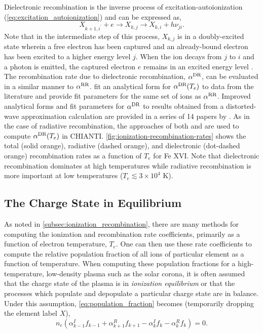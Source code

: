 Dielectronic recombination is the inverse process of excitation-autoionization (\autoref{eq:excitation_autoionization}) and can be expressed as,
\begin{equation}\label{eq:dielectronic_recombination}
    X_{k+1,i^\prime} + e \to X_{k,j} \to X_{k,i} + h\nu_{ji}.
\end{equation}
Note that in the intermediate step of this process, $X_{k,j}$ is in a doubly-excited state wherein a free electron has been captured and an already-bound electron has been excited to a higher energy level $j$. When the ion decays from $j$ to $i$ and a photon is emitted, the captured electron $e$ remains in an excited energy level \citep{bradshaw_collisional_2013}. The recombination rate due to dielectronic recombination, $\alpha^\textup{DR}$, can be evaluated in a similar manner to $\alpha^\textup{RR}$. \citet{shull_ionization_1982} fit an analytical form for $\alpha^\textup{DR}(T_e)$ to data from the literature and provide fit parameters for the same set of ions as $\alpha^\textup{RR}$. Improved analytical forms and fit parameters for $\alpha^\textup{DR}$ to results obtained from a distorted-wave approximation calculation are provided in a series of 14 papers by \citet{badnell_dielectronic_2003}. As in the case of radiative recombination, the approaches of both \citet{shull_ionization_1982} and \citet{badnell_dielectronic_2003} are used to compute $\alpha^\textup{DR}(T_e)$ in CHIANTI. \autoref{fig:ionization-recombination-rates} shows the total (solid orange), radiative (dashed orange), and dielectronic (dot-dashed orange) recombination rates as a function of $T_e$ for Fe XVI. Note that dielectronic recombination dominates at high temperatures while radiative recombination is more important at low temperatures ($T_e\lesssim3\times10^4$ K).

\subsection{The Charge State in Equilibrium}\label{sec:ioneq}

As noted in \autoref{subsec:ionization_recombination}, there are many methods for computing the ionization and recombination rate coefficients, primarily as a function of electron temperature, $T_e$. One can then use these rate coefficients to compute the relative population fraction of all ions of particular element as a function of temperature. When computing these population fractions for a high-temperature, low-density plasma such as the solar corona, it is often assumed that the charge state of the plasma is in \textit{ionization equilibrium} or that the processes which populate and depopulate a particular charge state are in balance. Under this assumption, \autoref{eq:population_fraction} becomes (temporarily dropping the element label $X$),
\begin{equation}\label{eq:ionization_equilibrium}
    n_e(\alpha_{k-1}^I f_{k-1} + \alpha_{k+1}^R f_{k+1} - \alpha_{k}^I f_k - \alpha_k^R f_k) = 0.
\end{equation}

